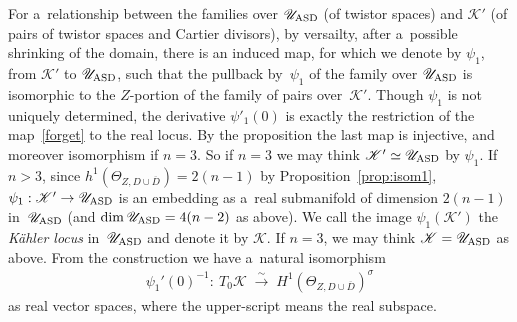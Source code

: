 \documentclass[pdftex]{sigma}
\numberwithin{equation}{section}
\begin{document}
For a~relationship between the families over $\mathscr U_{\rm{ASD}}$ (of twistor spaces) and $\mathscr K'$ (of pairs of
twistor spaces and Cartier divisors), by versailty, after a~possible shrinking of the domain, there is an induced map,
for which we denote by $\psi_1$, from $\mathscr K'$ to $\mathscr U_{\rm{ASD}}$, such that the pullback by~$\psi_1$ of
the family over $\mathscr U_{\rm{ASD}}$ is isomorphic to the $Z$-portion of the family of pairs over~$\mathscr K'$.
Though $\psi_1$ is not uniquely determined, the derivative $\psi'_1(0)$ is exactly the restriction of the
map~\eqref{forget} to the real locus.
By the proposition the last map is injective, and moreover isomorphism if $n=3$.
So if $n=3$ we may think $\mathscr K' \simeq \mathscr U_{\rm{ASD}}$ by $\psi_1$.
If $n>3$, since $h^1(\Theta_{Z,D\cup\overline D}) = 2(n-1)$ by Proposition~\ref{prop:isom1}, $\psi_1:\mathscr
K'\to\mathscr U_{\rm{ASD}}$ is an embedding as a~real submanifold of dimension $2(n-1)$ in~$\mathscr U_{\rm{ASD}}$ (and
$\dim \mathscr U_{\rm{ASD}} = 4(n-2)$ as above).
We call the image $\psi_1(\mathscr K')$ the {\em K\"ahler locus} in~$\mathscr U_{\rm ASD}$ and denote it by $\mathscr
K$.
If $n=3$, we may think $\mathscr K = \mathscr U_{\rm{ASD}}$ as above.
From the construction we have a~natural isomorphism
\begin{gather*}
\psi_1'(0)^{-1}: \ T_0\mathscr K
\;\stackrel{\sim}{\longrightarrow}
\;
H^1(\Theta_{Z,D\cup\overline D})^{\sigma}
\end{gather*}
as real vector spaces, where the upper-script means the real subspace.
\end{document}
